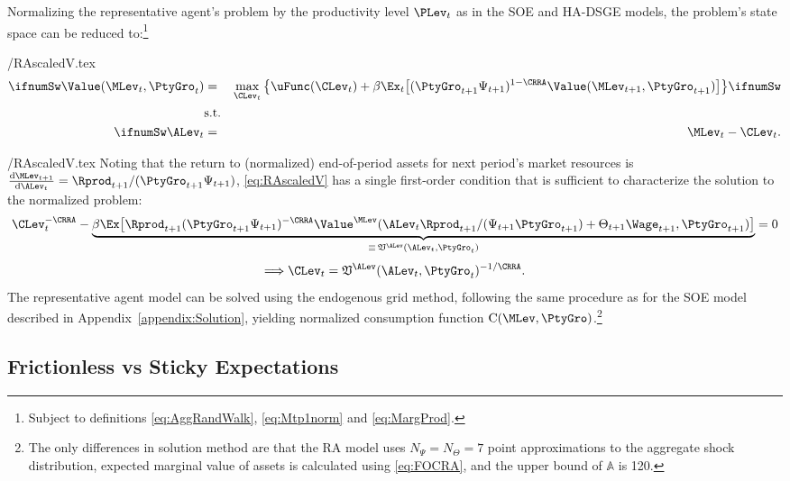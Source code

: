 Normalizing the representative agent's problem by the productivity level $\PLev_t$ as in
the SOE and HA-DSGE models, the problem's state space can be reduced to:\footnote{Subject to definitions \eqref{eq:AggRandWalk}, \eqref{eq:Mtp1norm} and \eqref{eq:MargProd}.}
\begin{verbatimwrite}{\eq/RAscaledV.tex}
\begin{eqnarray}
\ifnumSw  \Value(\MLev_{t},\PtyGro_t) & = & \max_{\CLev_{t}} \big\{ \uFunc(\CLev_{t}) + \beta \Ex_{t} \big[ (\PtyGro_{t+1}\Psi_{t+1})^{1-\CRRA} \Value(\MLev_{t+1},\PtyGro_{t+1}) \big] \big\} \label{eq:RAscaledV} \ifnumSw
\\  & \mbox{s.t.} & \nonumber
\\ \ifnumSw \ALev_{t} & = & \MLev_{t}-\CLev_{t}. \nonumber
\end{eqnarray}
\end{verbatimwrite}
 \eq/RAscaledV.tex
Noting that the return to (normalized) end-of-period assets for next period's
market resources is
$\frac{\text{d}\MLev_{t+1}}{\text{d} \ALev_{t}} = \Rprod_{t+1}/(\PtyGro_{t+1}\Psi_{t+1})$,
\eqref{eq:RAscaledV} has a single first-order condition that is sufficient
to characterize the solution to the normalized problem:
\begin{equation}\label{eq:FOCRA}
\CLev_t^{-\CRRA} - \underbrace{\beta \Ex \big[\Rprod_{t+1} (\PtyGro_{t+1}\Psi_{t+1})^{-\CRRA} \Value^\MLev(\ALev_{t} \Rprod_{t+1}/(\Psi_{t+1} \PtyGro_{t+1}) + \Theta_{t+1} \Wage_{t+1}, \PtyGro_{t+1})  \big]}_{\equiv\, \mathfrak{V}^\ALev(\ALev_t,\PtyGro_t)} = 0
\end{equation}
\begin{equation*}
\Longrightarrow \CLev_t = \mathfrak{V}^\ALev(\ALev_t,\PtyGro_t)^{-1/\CRRA}.
\end{equation*}
The representative agent model can be solved using the endogenous grid method,
following the same procedure as for the SOE model described in Appendix~\ref{appendix:Solution}, yielding
 normalized consumption function $\text{C}(\MLev,\PtyGro)$.\footnote{The only
differences in solution method are that the RA model uses $N_\Psi=N_\Theta=7$ point
approximations to the aggregate shock distribution, expected marginal value of assets
is calculated using \eqref{eq:FOCRA}, and the upper bound of $\mathbb{A}$ is 120.}


\subsection{Frictionless vs Sticky Expectations}

